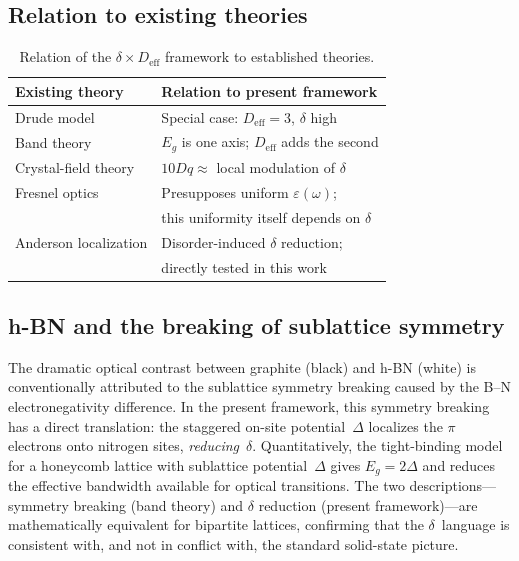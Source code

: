 \documentclass[twocolumn,showpacs,preprintnumbers,amsmath,amssymb,prb]{revtex4-2}
\begin{document}
\subsection{Relation to existing theories}

\begin{table}[h]
\caption{Relation of the $\delta \times D_\mathrm{eff}$ framework to
  established theories.}
\label{tab:existing}
\begin{ruledtabular}
\begin{tabular}{ll}
  Existing theory & Relation to present framework \\
  \hline
  Drude model & Special case: $D_\mathrm{eff} = 3$, $\delta$ high \\
  Band theory & $E_g$ is one axis; $D_\mathrm{eff}$ adds the second \\
  Crystal-field theory & $10Dq \approx$ local modulation of $\delta$ \\
  Fresnel optics & Presupposes uniform $\varepsilon(\omega)$; \\
   & this uniformity itself depends on $\delta$ \\
  Anderson localization & Disorder-induced $\delta$ reduction; \\
   & directly tested in this work \\
\end{tabular}
\end{ruledtabular}
\end{table}

\subsection{h-BN and the breaking of sublattice symmetry}
\label{sec:hBN_discussion}

The dramatic optical contrast between graphite (black) and h-BN (white)
is conventionally attributed to the sublattice symmetry breaking caused
by the B--N electronegativity difference. In the present framework, this
symmetry breaking has a direct translation: the staggered on-site
potential~$\Delta$ localizes the $\pi$ electrons onto nitrogen sites,
\emph{reducing}~$\delta$. Quantitatively, the tight-binding model for a
honeycomb lattice with sublattice potential~$\Delta$ gives
$E_g = 2\Delta$ and reduces the effective bandwidth available for
optical transitions. The two descriptions---symmetry breaking (band
theory) and $\delta$ reduction (present framework)---are mathematically
equivalent for bipartite lattices, confirming that the $\delta$~language
is consistent with, and not in conflict with, the standard solid-state
picture.
\end{document}
